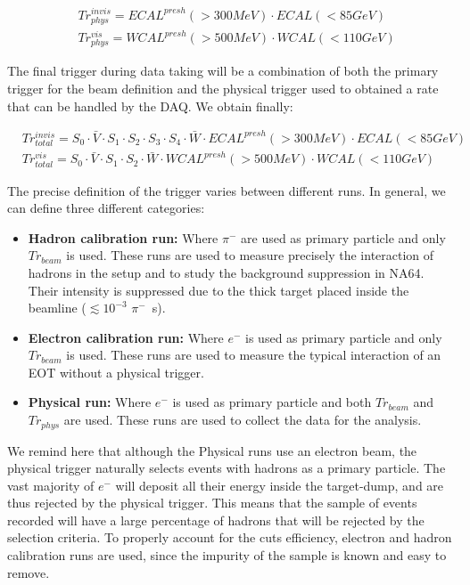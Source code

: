 \begin{equation}
\label{eq:trigger-phys}
\begin{split}
& Tr^{invis}_{phys} = ECAL^{presh}(>300 MeV) \cdot ECAL(<85 GeV)\\
& Tr^{vis}_{phys} = WCAL^{presh}(>500 MeV) \cdot WCAL(<110 GeV)
\end{split}
\end{equation}

The final trigger during data taking will be a combination of both the primary trigger for the beam definition and the physical trigger used to obtained a rate that can be handled by the DAQ. We obtain finally:

\begin{equation}
\label{eq:trigger-total}
\begin{split}
& Tr^{invis}_{total} = S_0 \cdot \bar{V} \cdot S_1 \cdot S_2 \cdot S_3 \cdot S_4 \cdot \bar{W} \cdot ECAL^{presh}(>300 MeV) \cdot ECAL(<85 GeV)\\
& Tr^{vis}_{total} = S_0 \cdot \bar{V} \cdot S_1 \cdot S_2\cdot \bar{W} \cdot WCAL^{presh}(>500 MeV) \cdot WCAL(<110 GeV)
\end{split}
\end{equation}

The precise definition of the trigger varies between different runs. In general, we can define three different categories:

\begin{itemize}
\item \textbf{Hadron calibration run:} Where $\pi^-$ are used as primary particle and only $Tr_{beam}$ is used. These runs are used to measure precisely the interaction of hadrons in the setup and to study the background suppression in NA64. Their intensity is suppressed due to the thick target placed inside the beamline ($\lesssim 10^{-3}$ $\pi^-$\si{\per\second}).
\item \textbf{Electron calibration run:} Where $e^-$ is used as primary particle and only $Tr_{beam}$ is used. These runs are used to measure the typical interaction of an EOT without a physical trigger. 
\item \textbf{Physical run:} Where $e^-$ is used as primary particle and both $Tr_{beam}$ and $Tr_{phys}$ are used. These runs are used to collect the data for the analysis. 
\end{itemize}

We remind here that although the Physical runs use an electron beam, the physical trigger naturally selects events with hadrons as a primary particle. The vast majority of $e^-$ will deposit all their energy inside the target-dump, and are thus rejected by the physical trigger. This means that the sample of events recorded will have a large percentage of hadrons that will be rejected by the selection criteria. To properly account for the cuts efficiency, electron and hadron calibration runs are used, since the impurity of the sample is known and easy to remove.

